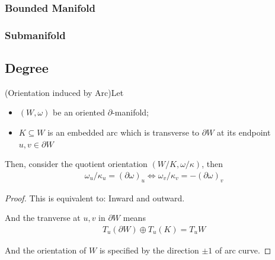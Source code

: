 \documentclass[Total.tex]{subfiles}
\begin{document}
				\subsubsection{Bounded Manifold}
				
				\subsubsection{Submanifold}
			\subsection{Degree}
				\begin{lemma}
					(Orientation induced by Arc)Let 
					\begin{itemize}
						\item $(W,\omega)$ be an oriented $\partial$-manifold;
						\item $K\subseteq W$ is an embedded arc which is transverse to $\partial W$ at its endpoint $u,v\in \partial W$
					\end{itemize}
					
					Then, consider the quotient orientation $(W/K,\omega/\kappa)$, then
					\begin{gather*}
						\omega_u/\kappa_u=(\partial\omega)_u\Leftrightarrow \omega_v/\kappa_v=-(\partial \omega)_v
					\end{gather*}
				\end{lemma}
				\begin{proof}
					This is equivalent to: Inward and outward. 
					
					And the tranverse at $u,v$ in $\partial W$ means
					\begin{gather*}
						T_u(\partial W)\oplus T_u(K)=T_u W
					\end{gather*} 
					
					And the orientation of $W$ is specified by the direction $\pm 1$ of arc curve.
				\end{proof}
				
\end{document}
